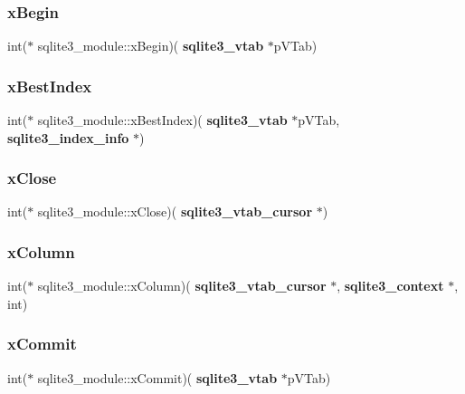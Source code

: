 \subsubsection{xBegin}
{\footnotesize\ttfamily int($\ast$ sqlite3\+\_\+module\+::x\+Begin)(\textbf{ sqlite3\+\_\+vtab} $\ast$p\+V\+Tab)}

\mbox{\label{structsqlite3__module_a66577e230ca8de525b30ee6f287eafb1}} 
\subsubsection{xBestIndex}
{\footnotesize\ttfamily int($\ast$ sqlite3\+\_\+module\+::x\+Best\+Index)(\textbf{ sqlite3\+\_\+vtab} $\ast$p\+V\+Tab, \textbf{ sqlite3\+\_\+index\+\_\+info} $\ast$)}

\mbox{\label{structsqlite3__module_a514c66634a5297ca9879947fa6f8f10f}} 
\subsubsection{xClose}
{\footnotesize\ttfamily int($\ast$ sqlite3\+\_\+module\+::x\+Close)(\textbf{ sqlite3\+\_\+vtab\+\_\+cursor} $\ast$)}

\mbox{\label{structsqlite3__module_a4c82dc60335ba40c816cdd6c4dce2950}} 
\subsubsection{xColumn}
{\footnotesize\ttfamily int($\ast$ sqlite3\+\_\+module\+::x\+Column)(\textbf{ sqlite3\+\_\+vtab\+\_\+cursor} $\ast$, \textbf{ sqlite3\+\_\+context} $\ast$, int)}

\mbox{\label{structsqlite3__module_a465df78231717713e98677c19e60cece}} 
\subsubsection{xCommit}
{\footnotesize\ttfamily int($\ast$ sqlite3\+\_\+module\+::x\+Commit)(\textbf{ sqlite3\+\_\+vtab} $\ast$p\+V\+Tab)}

\mbox{\label{structsqlite3__module_acdd9ccc4a6acff230b2d579172ae32d0}} 
